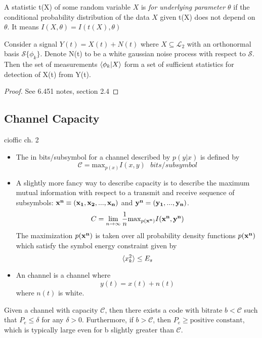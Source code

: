 \documentclass[11pt]{scrartcl}
\begin{document}
\begin{definition}
	A statistic t(X) of some random variable $X$ is  \emph{for underlying parameter $\theta$}  if the conditional probability distribution of the data $X$ given t(X) does not depend on $\theta$.  
	It means $I(X, \theta) = I(t(X), \theta)$
\end{definition}

\begin{definition}
	\end{definition}

\begin{theorem}
	Consider a signal $Y(t) = X(t) + N(t)$ where $X \subseteq \mathcal{L}_2$ with an orthonormal basis $ \mathcal{S} \{  \phi_k \}$.  Denote N(t) to be a white gaussian noise process with respect to $\mathcal{S}$.  Then the set of measurements $\braket{ \phi_k | X}$ form a set of sufficient statistics for detection of X(t) from Y(t).
	\end{theorem}

\begin{proof} See 6.451 notes, section 2.4
	\end{proof}


\subsection{Channel Capacity}
cioffic ch. 2

\begin{itemize}
	\item The  in bits/subsymbol for a channel described by $p(y|x)$ is defined by
	\[  \mathcal{C} = \mathrm{max}_{p(x)} I(x, y) \text{ } bits/subsymbol \]
	\item A slightly more fancy way to describe capacity is to describe the maximum mutual information with respect to a transmit and receive sequence of subsymbols: $\bf{x}^n \equiv (x_1, x_2, ..., x_{n})$ and $\bf{y}^n = (y_1, ..., y_n)$.
	\[ C = \lim_{n \rightarrow \infty} {1 \over n} \mathrm{max}_{p(\bf{x}^n)} I(\bf{x}^n, \bf{y}^n) \]
	The maximization $p(\bf{x}^n)$ is taken over all probability density functions $p(\bf{x}^n)$ which satisfy the symbol energy constraint given by 
	\[ \braket{x_k^2} \leq E_s \]
	\item An  channel is a channel where 
	\[y(t) = x(t) + n(t) \]
	where $n(t)$ is white.
\end{itemize}

\begin{theorem} 
	Given a channel with capacity $\mathcal{C}$, then there exists a code with bitrate $b < \mathcal{C}$ such that 
	$P_e \leq \delta$ for any $ \delta > 0$.  Furthermore, if $b > \mathcal{C}$, then $P_e  \geq \text{positive constant}$, which is typically large even for b slightly greater than $\mathcal{C}$.
	\end{theorem}
\end{document}
